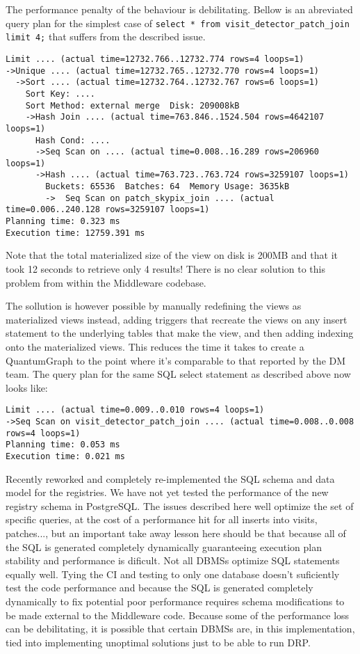 The performance penalty of the behaviour is debilitating. Bellow is an abreviated query plan for the simplest case of \lstinline[basicstyle=\ttfamily]{select * from visit_detector_patch_join limit 4;} that suffers from the described issue.

\begin{lstlisting}[style=sqlprompt]
Limit .... (actual time=12732.766..12732.774 rows=4 loops=1)
->Unique .... (actual time=12732.765..12732.770 rows=4 loops=1)
  ->Sort .... (actual time=12732.764..12732.767 rows=6 loops=1)
    Sort Key: ....
    Sort Method: external merge  Disk: 209008kB
    ->Hash Join .... (actual time=763.846..1524.504 rows=4642107 loops=1)
      Hash Cond: ....
      ->Seq Scan on .... (actual time=0.008..16.289 rows=206960 loops=1)
      ->Hash .... (actual time=763.723..763.724 rows=3259107 loops=1)
        Buckets: 65536  Batches: 64  Memory Usage: 3635kB
        ->  Seq Scan on patch_skypix_join .... (actual time=0.006..240.128 rows=3259107 loops=1)
Planning time: 0.323 ms
Execution time: 12759.391 ms
\end{lstlisting}

Note that the total materialized size of the view on disk is 200MB and that it took 12 seconds to retrieve only 4 results! There is no clear solution to this problem from within the Middleware codebase. 

The sollution is however possible by manually redefining the views as materialized views instead, adding triggers that recreate the views on any insert statement to the underlying tables that make the view, and then adding indexing onto the materialized views. This reduces the time it takes to create a QuantumGraph to the point where it's comparable to that reported by the DM team. The query plan for the same SQL select statement as described above now looks like:

\begin{lstlisting}[style=sqlprompt]
Limit .... (actual time=0.009..0.010 rows=4 loops=1)
->Seq Scan on visit_detector_patch_join .... (actual time=0.008..0.008 rows=4 loops=1)
Planning time: 0.053 ms
Execution time: 0.021 ms
\end{lstlisting}

Recently  reworked and completely re-implemented the SQL schema and data model for the registries. We have not yet tested the performance of the new registry schema in PostgreSQL. The issues described here well optimize the set of specific queries, at the cost of a performance hit for all inserts into visits, patches..., but an important take away lesson here should be that because all of the SQL is generated completely dynamically guaranteeing execution plan stability and performance is dificult. Not all DBMSs optimize SQL statements equally well. Tying the CI and testing to only one database doesn't suficiently test the code performance and because the SQL is generated completely dynamically to fix potential poor performance requires schema modifications to be made external to the Middleware code. Because some of the performance loss can be debilitating, it is possible that certain DBMSs are, in this implementation, tied into implementing unoptimal solutions just to be able to run DRP.

